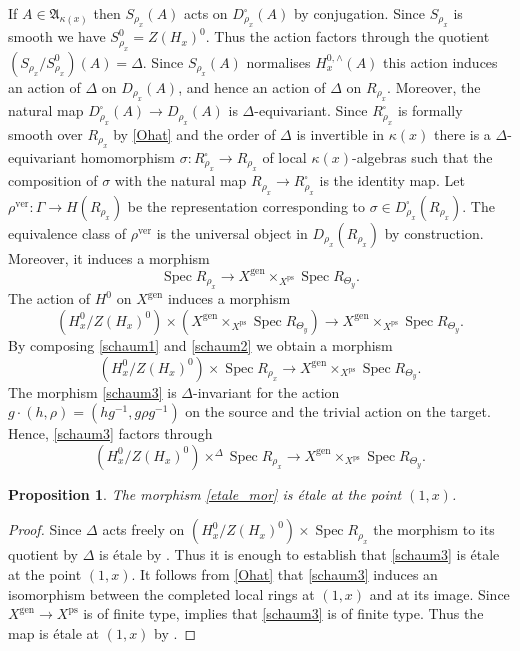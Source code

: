 \documentclass{amsart}
\newtheorem{prop}{Proposition}[section]
\theoremstyle{definition}
\theoremstyle{remark}
\DeclareMathOperator{\Spec}{Spec}
\newcommand{\gen}{\mathrm{gen}}
\newcommand{\ps}{\mathrm{ps}}
\newcommand{\ver}{\mathrm{ver}}
\begin{document}
If $A\in \mathfrak A_{\kappa(x)}$ then 
$S_{\rho_x}(A)$ acts on $D^{\square}_{\rho_x}(A)$ by conjugation. 
Since $S_{\rho_x}$ is smooth we have $S_{\rho_x}^0=Z(H_x)^0$.
Thus the 
action factors through the quotient
$(S_{\rho_x}/S^0_{\rho_x})(A)=\Delta$. 
Since $S_{\rho_x}(A)$ normalises $H^{0,\wedge}_x(A)$ this action induces 
an action of $\Delta$ on $D_{\rho_x}(A)$, 
and hence an action of $\Delta$ on $R_{\rho_x}$. Moreover, the natural map $D^{\square}_{\rho_x}(A)\rightarrow D_{\rho_x}(A)$ is 
$\Delta$-equivariant. Since $R^{\square}_{\rho_x}$ is formally 
smooth over $R_{\rho_x}$ by \eqref{Ohat} and the order of $\Delta$
is invertible in $\kappa(x)$ there is a $\Delta$-equivariant homomorphism $\sigma: R^{\square}_{\rho_x}\rightarrow R_{\rho_x}$ of local $\kappa(x)$-algebras such that the composition of $\sigma$ with 
the natural map $R_{\rho_x}\rightarrow R^{\square}_{\rho_x}$ is 
the identity map. Let  $\rho^{\ver}: \Gamma\rightarrow H(R_{\rho_x})$ be the representation corresponding to $\sigma\in D^{\square}_{\rho_x}(R_{\rho_x})$. The equivalence 
class of $\rho^{\ver}$ is the universal object in $D_{\rho_x}(R_{\rho_x})$ by construction. Moreover, it induces a morphism 
\begin{equation}\label{schaum1}
\Spec R_{\rho_x}\rightarrow X^{\gen}\times_{X^{\ps}} \Spec R_{\Theta_y}.
\end{equation}
The action of $H^0$ on $X^{\gen}$ induces a morphism 
\begin{equation}\label{schaum2}
  (H^0_x/Z(H_x)^0)\times( X^{\gen}\times_{X^{\ps}} \Spec R_{\Theta_y}) \rightarrow X^{\gen}\times_{X^{\ps}} \Spec R_{\Theta_y}.
\end{equation}
By composing \eqref{schaum1} and \eqref{schaum2} we obtain a morphism 
\begin{equation}\label{schaum3}
(H^0_x/Z(H_x)^0)\times \Spec R_{\rho_x}\rightarrow X^{\gen}\times_{X^{\ps}} \Spec R_{\Theta_y}.
\end{equation}
The morphism \eqref{schaum3} is $\Delta$-invariant 
for the action $g\cdot (h, \rho) = (hg^{-1}, g \rho g^{-1})$ on the source and the trivial action on the target.  Hence, \eqref{schaum3} factors through \begin{equation}\label{etale_mor}
(H^0_x/Z(H_x)^0)\times^\Delta \Spec R_{\rho_x}\rightarrow X^{\gen} \times_{X^{\ps}}\Spec R_{\Theta_y}.
\end{equation} 
\begin{prop} The morphism \eqref{etale_mor} 
is \'etale at the point $(1, x)$. 
\end{prop}
\begin{proof}
Since $\Delta$ acts freely on $(H^0_x/Z(H_x)^0)\times 
\Spec R_{\rho_x}$ the morphism  to its quotient by $\Delta$ is \'etale by \cite[Exp.\,V, Cor. 2.3]{SGA1}. Thus it is enough to establish that \eqref{schaum3} is \'etale at the 
point $(1,x)$. It follows from \eqref{Ohat} that \eqref{schaum3} induces an 
isomorphism between the completed local 
rings at $(1,x)$ and at its image. Since 
$X^{\gen} \rightarrow X^{\ps}$ is of finite type,  implies that \eqref{schaum3} is 
of finite type. Thus the map is \'etale at $(1, x)$ by \cite[Corollary 18.66]{GW2}.
\end{proof} 
\end{document}

